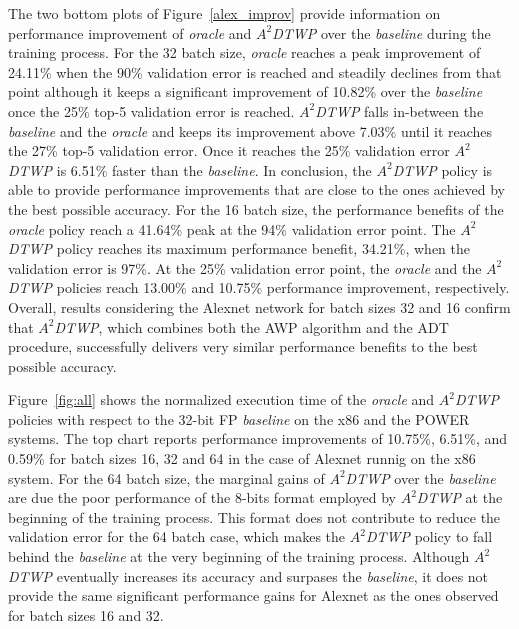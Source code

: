 The two bottom plots of Figure~\ref{alex_improv} provide information on 
performance improvement of \textit{oracle} and \textit{$A^2$DTWP} over the \textit{baseline} during the training process.
For the 32 batch size, \textit{oracle} reaches a peak improvement of 24.11\% when the 90\%  
validation error is reached and steadily declines from that point although it keeps a significant 
improvement of 10.82\% over the \textit{baseline} once the 25\% top-5 validation error is reached. 
\textit{$A^2$DTWP} falls in-between the \textit{baseline} and the \textit{oracle}  
and keeps its improvement above 7.03\% until it reaches the 27\% top-5 validation error.
Once it reaches the 25\% validation error \textit{$A^2$DTWP} is 6.51\% faster than the \textit{baseline}.
In conclusion, the \textit{$A^2$DTWP} policy is able to provide performance 
improvements that are close to the ones achieved by the best possible accuracy.
For the 16 batch size, the performance benefits of the 
\textit{oracle} policy reach a 41.64\% peak at the 94\% validation error point.
The \textit{$A^2$DTWP} policy reaches its maximum performance benefit, 34.21\%, when the validation error is 97\%.
At the 25\% validation error point, the \textit{oracle} and the 
\textit{$A^2$DTWP} policies reach 13.00\% and 10.75\% performance improvement, respectively.
Overall, results considering the Alexnet network for batch sizes 
32 and 16 confirm that \textit{$A^2$DTWP}, which combines both the 
AWP algorithm and the ADT procedure, successfully delivers very similar 
performance benefits to the best possible accuracy.

Figure~\ref{fig:all} shows the normalized execution time of the \textit{oracle} 
and \textit{$A^2$DTWP} policies with respect to the 32-bit FP \textit{baseline} on the x86 and the POWER systems. 
The top chart reports performance improvements of 10.75\%, 6.51\%, and 0.59\% for batch sizes 16, 32 and 64 in
the case of Alexnet runnig on the x86 system.  
For the 64 batch size, the marginal gains of \textit{$A^2$DTWP} over the \textit{baseline} are due the poor performance of the 8-bits format employed by \textit{$A^2$DTWP} at the beginning of the training process.
This format does not contribute to reduce the validation error for the 64 batch case, which makes the \textit{$A^2$DTWP} policy to fall behind the \textit{baseline} at the very beginning of the training process.  
Although \textit{$A^2$DTWP} eventually increases its accuracy and surpases the \textit{baseline}, it does not provide the same significant performance gains for Alexnet as the ones observed for batch sizes 16 and 32.

